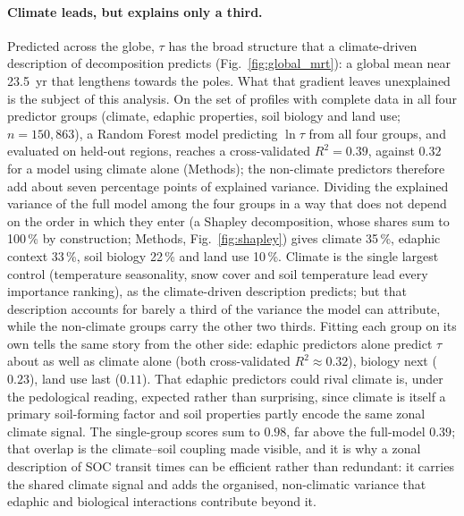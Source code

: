 \documentclass[12pt, a4paper]{article}
\begin{document}
\paragraph{Climate leads, but explains only a third.}
Predicted across the globe, $\tau$ has the broad structure that a climate-driven
description of decomposition predicts (Fig.~\ref{fig:global_mrt}): a global mean near
23.5~yr that lengthens towards the poles. What that gradient leaves unexplained is
the subject of this analysis. On the set of profiles with complete data in all four
predictor groups (climate, edaphic properties, soil biology and land use;
$n=150{,}863$), a Random Forest model predicting $\ln\tau$ from all four groups, and
evaluated on held-out regions, reaches a cross-validated $R^2=0.39$, against $0.32$
for a model using climate alone (Methods); the non-climate predictors therefore add
about seven percentage points of explained variance. Dividing the explained variance
of the full model among the four groups in a way that does not depend on the order
in which they enter (a Shapley decomposition, whose shares sum to 100\,\% by
construction; Methods, Fig.~\ref{fig:shapley}) gives climate 35\,\%, edaphic context
33\,\%, soil biology 22\,\% and land use 10\,\%. Climate is the single largest
control (temperature seasonality, snow cover and soil temperature lead every
importance ranking), as the climate-driven description predicts; but that
description accounts for barely a third of the variance the model can attribute,
while the non-climate groups carry the other two thirds. Fitting each group on its own tells the same story from the other side:
edaphic predictors alone predict $\tau$ about as well as climate alone (both
cross-validated $R^2\approx0.32$), biology next ($0.23$), land use last ($0.11$).
That edaphic predictors could rival climate is, under the pedological reading, expected
rather than surprising, since climate is itself a primary soil-forming factor and
soil properties partly encode the same zonal climate signal. The single-group scores
sum to $0.98$, far above the full-model $0.39$; that overlap is the climate--soil
coupling made visible, and it is why a zonal description of SOC transit times can be
efficient rather than redundant: it carries the shared climate signal and adds the
organised, non-climatic variance that edaphic and biological interactions contribute
beyond it.
\end{document}
